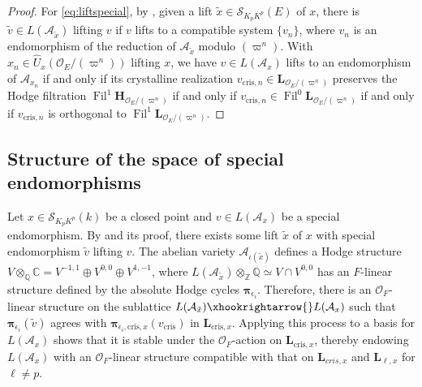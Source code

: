 \documentclass{amsart}
\numberwithin{equation}{subsection}
\numberwithin{theorem}{section}
\theoremstyle{definition}
\theoremstyle{remark}
\newcommand{\bC}{\mathbb{C}}
\newcommand{\bQ}{\mathbb{Q}}
\newcommand{\bZ}{\mathbb{Z}}
\newcommand{\cA}{\mathcal{A}}
\newcommand{\cO}{\mathcal{O}}
\newcommand{\cris}{_{\mathrm{cris}}}
\DeclareMathOperator{\Fil}{Fil}
\begin{document}
\begin{proof}
    For \eqref{eq:liftspecial}, by , given a lift $\tilde{x}\in \mathscr{S}_{K_pK^p}(E)$ of $x$, there is $\tilde{v} \in L(\cA_{\tilde{x}})$ lifting $v$ if $v$ lifts to a compatible system $\{v_n\}$, 
    where $v_n$ is an endomorphism of the reduction of $\cA_{\tilde{x}}$ modulo $(\varpi^n)$.
    With $x_n \in \widehat{U}_x(\mathcal{O}_E/(\varpi^n))$ lifting $x$, we have $v\in L(\mathcal{A}_x)$ lifts to an endomorphism of $\mathcal{A}_{x_n}$ if and only if its crystalline realization $v_{\mathrm{cris},n}\in \bm{L}_{\cO_E/(\varpi^n)}$ preserves the Hodge filtration $\Fil^1 \bm{H}_{\cO_E/(\varpi^n)} $ if and only if $v_{\mathrm{cris},n}\in \Fil^0\bm{L}_{\cO_E/(\varpi^n)}$ if and only if $v_{\mathrm{cris},n}$ is orthogonal to $\Fil^1\bm{L}_{\cO_E/(\varpi^n)}$. 
\end{proof}



\subsection{Structure of the space of special endomorphisms} \label{sec:specialendsupersingular} %

Let $x\in \mathscr{S}_{K_pK^p}(k)$ be a closed point and $v\in L(\mathcal{A}_x)$ be a special endomorphism. By  and its proof, there exists some lift $\tilde{x}$ of $x$ with special endomorphism $\tilde{v}$ lifting $v$. The abelian variety $\cA_{\iota(\tilde{x})}$ defines a Hodge structure $V\otimes_{\bQ}\bC = V^{-1,1}\oplus V^{0,0}\oplus V^{1,-1}$, where $L(\mathcal{A}_{\tilde{x}})\otimes_{\bZ}\bQ \simeq V\cap V^{0,0}$ has an $F$-linear structure defined by the absolute Hodge cycles $\bm{\pi}_{{\epsilon_i}}$. Therefore, there is an $\mathcal{O}_F$-linear structure on the sublattice $L(\mathcal{A}_{\tilde{x}}) \xhookrightarrow{} L(\mathcal{A}_x)$ such that $\bm\pi_{{\epsilon_i}} (\tilde{v})$ agrees with $\bm\pi_{{\epsilon_i}, \mathrm{cris}, x}(v\cris)$ in $\bm{L}_{\mathrm{cris},x}$. Applying this process to a basis for $L(\mathcal{A}_x)$ shows that it is stable under the $\mathcal{O}_F$-action on $\bm{L}_{\mathrm{cris},x}$, thereby endowing $L(\mathcal{A}_x)$ with an $\mathcal{O}_F$-linear structure compatible with that on $\bm{L}_{cris,x}$ and $\bm{L}_{\ell,x}$ for $\ell\neq p$. 
   
\end{document}
